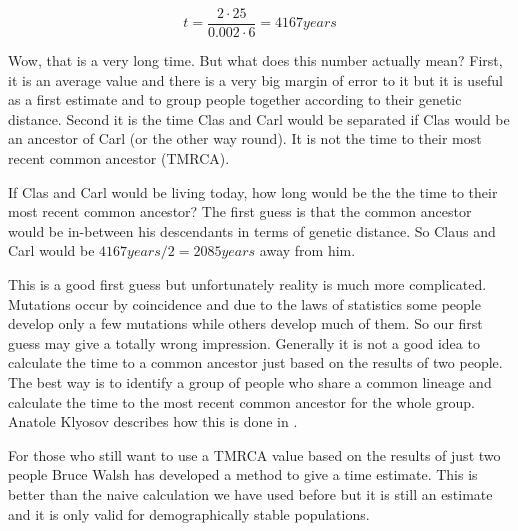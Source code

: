 \begin{equation}
t = \frac{2 \cdot 25}{0.002 \cdot 6} = 4167 years
\end{equation}

Wow, that is a very long time. But what does this number
actually mean? First, it is an average value and there is
a very big margin of error to it but it is useful as a first
estimate and to group people together according to their
genetic distance. Second it is the time Clas and Carl would
be separated if Clas would be an ancestor of Carl (or the
other way round). It is not the time to their most recent
common ancestor (TMRCA).

If Clas and Carl would be living today, how long would be the
the time to their most recent common ancestor? The first guess
is that the common ancestor would be in-between his descendants
in terms of genetic distance. So Claus and Carl would be
$4167years / 2 = 2085years$ away from him. 

This is a good first guess but unfortunately reality is much
more complicated. Mutations occur by coincidence and due to
the laws of statistics some people develop only a few mutations
while others develop much of them. So our first guess may give
a totally wrong impression. Generally it is not a good idea to
calculate the time to a common ancestor just based on the results
of two people. The best way is to identify a group of people who
share a common lineage and calculate the time to the most recent
common ancestor for the whole group. Anatole Klyosov describes
how this is done in \cite{Kly09}.

For those who still want to use a TMRCA value based on the results
of just two people Bruce Walsh has developed a method to give
a time estimate\cite{Wal01}. This is better than the naive
calculation we have used before but it is still an estimate and
it is only valid for demographically stable populations.






















